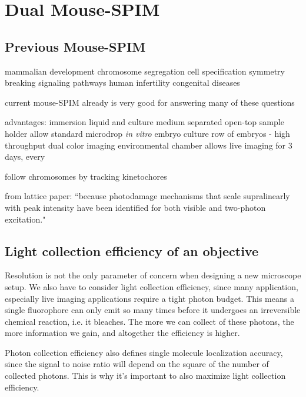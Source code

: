 

\chapter{Dual Mouse-SPIM}

\graphicspath{{./figures/2_DualMouse/}}

\section{Previous Mouse-SPIM}
mammalian development
chromosome segregation
cell specification
symmetry breaking
signaling pathways
human infertility
congenital diseases 

current mouse-SPIM \cite{strnad_inverted_2016} already is very good for answering many of these questions

advantages:
    immersion liquid and culture medium separated
    open-top sample holder allow standard microdrop \textit{in vitro} embryo culture
    row of embryos - high throughput
    dual color imaging
    environmental chamber allows live imaging for 3 days, every 

follow chromosomes by tracking kinetochores

from lattice paper: ``because photodamage mechanisms that scale supralinearly with peak intensity have been identified for both visible \cite{donnert_major_2007} and two-photon \cite{ji_high-speed_2008} excitation."



\section{Light collection efficiency of an objective}
Resolution is not the only parameter of concern when designing a new microscope setup. We also have to consider light collection efficiency, since many application, especially live imaging applications require a tight photon budget. This means a single fluorophore can only emit so many times before it undergoes an irreversible chemical reaction, i.e. it bleaches. The more we can collect of these photons, the more information we gain, and altogether the efficiency is higher.

Photon collection efficiency also defines single molecule localization accuracy, since the signal to noise ratio will depend on the square of the number of collected photons. This is why it's important to also maximize light collection efficiency.

